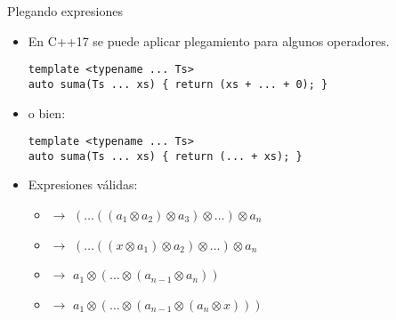 \begin{frame}[t,fragile]{Plegando expresiones}
\begin{itemize}
  \item En C++17 se puede aplicar plegamiento para algunos operadores.
\begin{lstlisting}
template <typename ... Ts>
auto suma(Ts ... xs) { return (xs + ... + 0); }
\end{lstlisting}
  \vfill
  \item o bien:
\begin{lstlisting}
template <typename ... Ts>
auto suma(Ts ... xs) { return (... + xs); }
\end{lstlisting}

  \vfill\pause
  \item Expresiones válidas:
    \begin{itemize}
      \item {} \quad $\rightarrow$ \quad 
            $(\ldots((a_1 \otimes a_2) \otimes a_3) \otimes \ldots) \otimes a_n$
      \item {} \quad $\rightarrow$ \quad
            $(\ldots((x \otimes a_1) \otimes a_2) \otimes \ldots) \otimes a_n$
      \item {} \quad $\rightarrow$ \quad
            $a_1 \otimes (\ldots \otimes (a_{n-1} \otimes a_n))$ 
      \item {} \quad $\rightarrow$ \quad
            $a_1 \otimes (\ldots \otimes (a_{n-1} \otimes (a_n \otimes x)))$ 
    \end{itemize}
\end{itemize}
\end{frame}
